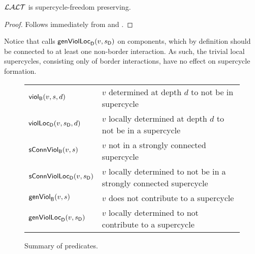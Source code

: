 \begin{theorem} \label{thm:LAO.SC-free-preserving}
$\LAO$ is supercycle-freedom preserving.
\end{theorem}
%
\begin{proof}
Follows immediately from  and .
\end{proof}
%
Notice that  calls $\locFormViol{v}{\sD}{\act}{\l}$ on components, which by definition should be connected to at least one non-border interaction. 
As such, the trivial local supercycles, \ie consisting only of border interactions, have no effect on supercycle formation. 

\begin{figure}[t]

\begin{tabular}{|l|l|}
\hline
$\scViol{v}{d}{s}$  & $v$ determined at depth $d$ to not be in supercycle\\ 
$\locScViol{v}{d}{\sD}{\act}{\l}$ & $v$ locally determined at depth $d$ to not be in a supercycle\\

$\connViol{v}{s}$ & $v$ not in a strongly connected supercycle \\

$\locConnViol{v}{\sD}{\act}{\l}$ & $v$ locally determined to not be in a strongly connected supercycle \\

$\formViol{v}{s}$ & $v$ does not contribute to a supercycle\\

$\locFormViol{v}{\sD}{\act}{\l}$ & $v$ locally determined to not contribute to a supercycle\\

\hline
\end{tabular}

\caption{Summary of predicates.}
\label{fig:summaryPredicates}
\end{figure}











